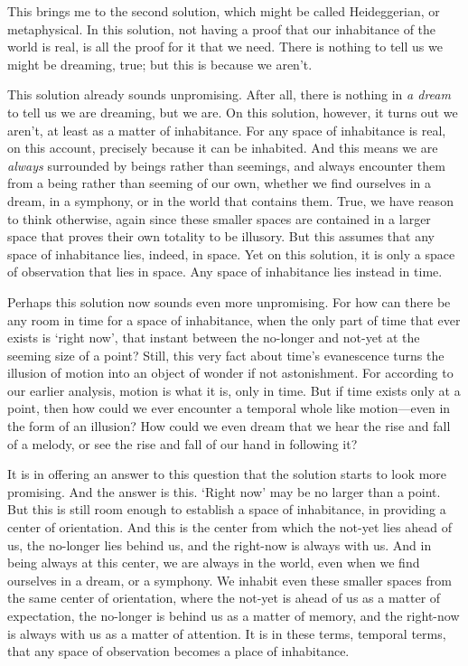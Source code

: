 \documentclass[12pt]{memoir}
\begin{document}
This brings me to the second solution, which might
be called Heideggerian, or metaphysical. In this
solution, not having a proof that our inhabitance
of the world is real, is all the proof for it that
we need. There is nothing to tell us we might be
dreaming, true; but this is because we aren't.

This solution already sounds unpromising. After
all, there is nothing in \emph{a dream} to
tell us we are dreaming, but we are. On this
solution, however, it turns out we aren't, at
least as a matter of inhabitance. For any space of
inhabitance is real, on this account, precisely
because it can be inhabited. And this means we are
\emph{always} surrounded by beings rather than
seemings, and always encounter them from a being
rather than seeming of our own, whether we find
ourselves in a dream, in a symphony, or in the
world that contains them. True, we have reason to
think otherwise, again since these smaller spaces
are contained in a larger space that proves their
own totality to be illusory. But this assumes
that any space of inhabitance lies, indeed, in
space. Yet on this solution, it is only a space
of observation that lies in space. Any space of
inhabitance lies instead in time.

Perhaps this solution now sounds even more
unpromising. For how can there be any room in time
for a space of inhabitance, when the only part of
time that ever exists is `right now', that instant
between the no-longer and not-yet at the seeming
size of a point? Still, this very fact about
time's evanescence turns the illusion of motion
into an object of wonder if not astonishment.
For according to our earlier analysis, motion is
what it is, only in time. But if time exists only
at a point, then how could we ever encounter a
temporal whole like motion---even in the form of
an illusion? How could we even dream that we hear
the rise and fall of a melody, or see the rise and
fall of our hand in following it?

It is in offering an answer to this question that the solution starts to
look more promising. And the answer is this. `Right now' may be no
larger than a point. But this is still room enough to establish a space
of inhabitance, in providing a center of orientation. And this is the
center from which the not-yet lies ahead of us, the no-longer lies
behind us, and the right-now is always with us. And in being always at
this center, we are always in the world, even when we find ourselves in
a dream, or a symphony. We inhabit even these smaller spaces from the
same center of orientation, where the not-yet is ahead of us as a matter
of expectation, the no-longer is behind us as a matter of memory, and
the right-now is always with us as a matter of attention. It is in these
terms, temporal terms, that any space of observation becomes a place of
inhabitance.
\end{document}
